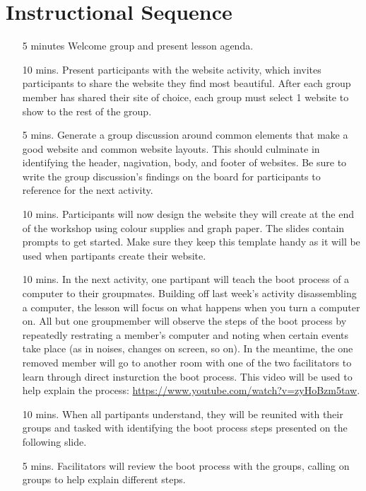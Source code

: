 \documentclass[12pt]{article}
\begin{document}
  \section*{Instructional Sequence}
  \begin{itemize}
    \item[5 minutes] Welcome group and present lesson agenda.
    \item[10 mins.] Present participants with the website activity, which
      invites participants to share the website they find most beautiful. After
      each group member has shared their site of choice, each group must select
      1 website to show to the rest of the group. 
    \item[5 mins.] Generate a group discussion
      around common elements that make a good website and common website
      layouts. This should culminate in identifying the header, nagivation,
      body, and footer of websites. Be sure to write the group discussion's
      findings on
      the board for participants to reference for the next activity.
    \item[10 mins.] Participants will now design the website they will create at
      the end of the workshop using colour supplies and graph paper. The slides
      contain
      prompts to get started. Make sure they
      keep this template handy as it will be used when partipants create their
      website.
    \item[10 mins.] In the next activity, one partipant will teach the boot
      process of a computer to
      their groupmates. Building off last week's activity disassembling a
      computer, the lesson will focus on what happens when you turn a computer on.
      All but one groupmember will observe the steps of
      the boot process by repeatedly restrating a member's computer and noting
      when certain events take place (as in noises, changes on screen, so on). In the
      meantime, the one removed member will go to another room with one of the
      two facilitators to learn through direct insturction the boot process.
      This video will be used to help explain the process: \url{https://www.youtube.com/watch?v=zyHoBzm5taw}.
    \item[10 mins.] When all partipants understand, they will be reunited with
      their groups and tasked with identifying the boot process steps presented
      on the following slide.
    \item[5 mins.] Facilitators will review the boot process with the groups,
      calling on groups to help explain different steps.

\end{itemize}
\end{document}
